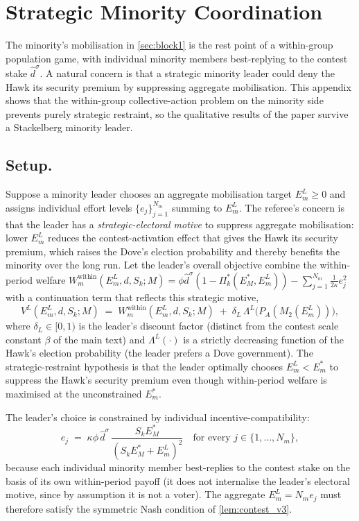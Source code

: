 \documentclass[11pt,twoside]{extarticle}
\begin{document}
\section{Strategic Minority Coordination}\label{oa:strategic_minority}

The minority's mobilisation in \autoref{sec:block1} is the rest point of a within-group population game, with individual minority members best-replying to the contest stake $\hat d^\sigma$. A natural concern is that a strategic minority leader could deny the Hawk its security premium by suppressing aggregate mobilisation. This appendix shows that the within-group collective-action problem on the minority side prevents purely strategic restraint, so the qualitative results of the paper survive a Stackelberg minority leader.

\subsection*{Setup.} Suppose a minority leader chooses an aggregate mobilisation target $E_m^L\ge 0$ and assigns individual effort levels $\{e_j\}_{j=1}^{N_m}$ summing to $E_m^L$. The referee's concern is that the leader has a \emph{strategic-electoral motive} to suppress aggregate mobilisation: lower $E_m^L$ reduces the contest-activation effect that gives the Hawk its security premium, which raises the Dove's election probability and thereby benefits the minority over the long run. Let the leader's overall objective combine the within-period welfare $W_m^{\text{within}}(E_m^L,d,S_k;M)=\phi\hat d^\sigma(1-\Pi_k^*(E_M^*,E_m^L))-\sum_{j=1}^{N_m}\frac{1}{2\kappa}e_j^2$ with a continuation term that reflects this strategic motive,
\begin{equation}\label{eq:leader_objective}
    V^L(E_m^L,d,S_k;M)\;=\;W_m^{\text{within}}(E_m^L,d,S_k;M)\;+\;\delta_L\,\Lambda^L\big(P_A(M_2(E_m^L))\big),
\end{equation}
where $\delta_L\in[0,1)$ is the leader's discount factor (distinct from the contest scale constant $\beta$ of the main text) and $\Lambda^L(\cdot)$ is a strictly decreasing function of the Hawk's election probability (the leader prefers a Dove government). The strategic-restraint hypothesis is that the leader optimally chooses $E_m^L<E_m^*$ to suppress the Hawk's security premium even though within-period welfare is maximised at the unconstrained $E_m^*$.

The leader's choice is constrained by individual incentive-compatibility:
\begin{equation}\label{eq:IC}
    e_j\;=\;\kappa\phi\,\hat d^\sigma\,\frac{S_kE_M^*}{(S_kE_M^*+E_m^L)^2}\quad\text{for every }j\in\{1,\dots,N_m\},
\end{equation}
because each individual minority member best-replies to the contest stake on the basis of its own within-period payoff (it does not internalise the leader's electoral motive, since by assumption it is not a voter). The aggregate $E_m^L=N_m e_j$ must therefore satisfy the symmetric Nash condition of \autoref{lem:contest_v3}.
\end{document}
